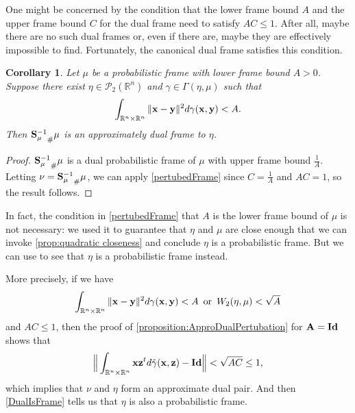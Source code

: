 \documentclass{amsart}
\numberwithin{equation}{section}
\theoremstyle{plain}
\newtheorem{corollary}[theorem]{Corollary}
\theoremstyle{remark}
\theoremstyle{definition}
\begin{document}
One might be concerned by the condition that the lower frame bound $A$ and the upper frame bound $C$ for the dual frame need to satisfy $AC \leq 1$. After all, maybe there are no such dual frames or, even if there are, maybe they are effectively impossible to find. Fortunately, the canonical dual frame satisfies this condition.   

\begin{corollary}
    Let $\mu$ be a probabilistic frame with lower frame bound $A>0$. Suppose there exist $\eta \in \mathcal{P}_2(\mathbb{R}^n)$  and $\gamma \in \Gamma(\eta, \mu) $ such that
    \begin{equation*}
        \int_{\mathbb{R}^n \times \mathbb{R}^n} \| {\bf x}- {\bf y} \|^2 d\gamma({\bf x},{\bf y})  < A.
    \end{equation*}
 Then ${{\bf S}_{\mu}^{-1}}_{\#}\mu$ is an approximately dual frame to $\eta$.
\end{corollary}

\begin{proof}
${{\bf S}_{\mu}^{-1}}_{\#}\mu$ is a dual probabilistic frame of $\mu$ with upper frame bound $\frac{1}{A}$. Letting $\nu = {{\bf S}_{\mu}^{-1}}_{\#}\mu$, we can apply \cref{pertubedFrame} since $C=\frac{1}{A}$ and $AC=1$, so the result follows. 
\end{proof}


In fact, the condition in \cref{pertubedFrame} that $A$ is the lower frame bound of $\mu$ is not necessary: we used it to guarantee that $\eta$ and $\mu$ are close enough that we can invoke \cref{prop:quadratic closeness} and conclude $\eta$ is a probabilistic frame. But we can use  to see that $\eta$ is a probabilistic frame instead. 

More precisely, if we have 
    \begin{equation*}
        \int_{\mathbb{R}^n \times \mathbb{R}^n} \| {\bf x}- {\bf y} \|^2 d\gamma({\bf x},{\bf y})  < A  \enskip\text{or} \enskip  W_2(\eta, \mu)  < \sqrt{A}
    \end{equation*}
and $AC \leq 1$, then the proof of \cref{proposition:ApproDualPertubation} for $\bf A =Id$ shows that
\begin{equation*}
    \Big \| \int_{\mathbb{R}^n \times \mathbb{R}^n} {\bf x} {\bf z}^t d\Tilde{\gamma}({\bf x, z}) - {\bf Id} \Big \| < \sqrt{AC} \leq 1, 
\end{equation*}
which implies that $\nu$ and $\eta$ form an approximate dual pair. And then \cref{DualIsFrame} tells us that $\eta$ is also a probabilistic frame. 
\end{document}
